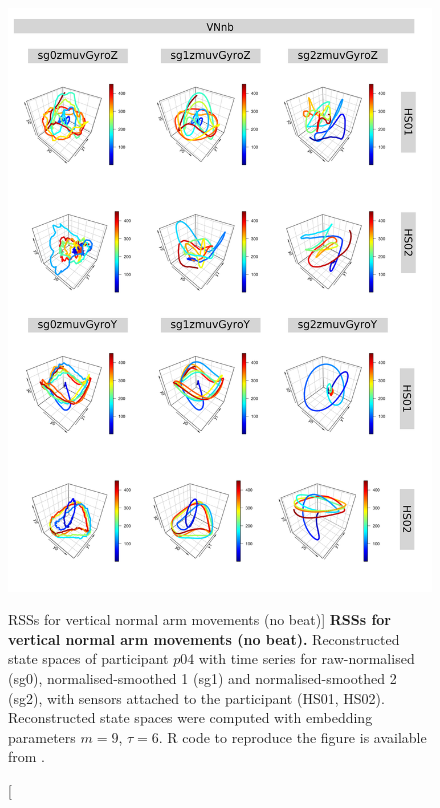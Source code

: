 

\begin{figure}
\centering
\includegraphics[height=0.8\textheight]{rss_VNnb_p04}
\caption
	[RSSs for vertical normal arm movements (no beat)]{
	{\bf RSSs for vertical normal arm movements (no beat).}
	Reconstructed state spaces of participant $p04$
	with time series for raw-normalised (sg0), 
	normalised-smoothed 1 (sg1) and 
	normalised-smoothed 2 (sg2), 
	with sensors attached to the participant (HS01, HS02).
	Reconstructed state spaces were computed with 
	embedding parameters $m=9$, $\tau=6$.
	R code to reproduce the figure is available from \cite{xochicale2018}.
        }
     \label{fig:rss_VNnb_p04}
\end{figure}




